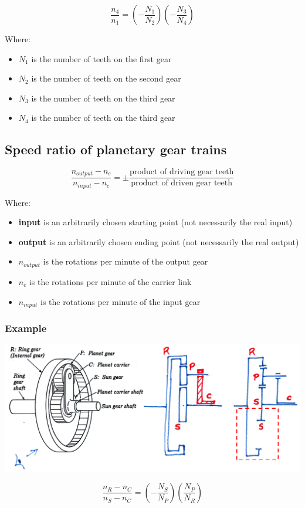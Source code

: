 \documentclass[11pt]{article}
\begin{document}
\[\frac{n_4}{n_1} = \left(- \frac{N_1}{N_2} \right) \left(- \frac{N_3}{N_4} \right)\]

Where:
\begin{itemize}
\item \(N_1\) is the number of teeth on the first gear
\item \(N_2\) is the number of teeth on the second gear
\item \(N_3\) is the number of teeth on the third gear
\item \(N_4\) is the number of teeth on the third gear
\end{itemize}
\subsection{Speed ratio of planetary gear trains}
\label{sec:org10c8f0c}
\[\frac{n_{output} - n_c}{n_{input} - n_c} = \pm \frac{\text{product of driving gear teeth}}{\text{product of driven gear teeth}}\]

Where:
\begin{itemize}
\item \textbf{input} is an arbitrarily chosen starting point (not necessarily the real input)
\item \textbf{output} is an arbitrarily chosen ending point (not necessarily the real output)
\item \(n_{output}\) is the rotations per minute of the output gear
\item \(n_{c}\) is the rotations per minute of the carrier link
\item \(n_{input}\) is the rotations per minute of the input gear
\end{itemize}
\subsubsection{Example}
\label{sec:orged4bba4}
\begin{center}
\includegraphics[width=.9\linewidth]{./images/planetary-gear-train-kinematic-diagram.png}
\end{center}
\[\frac{n_R - n_C}{n_S - n_C} = \left(- \frac{N_S}{N_P} \right) \left( \frac{N_P}{N_R}\right)\]
\end{document}
